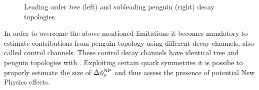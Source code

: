 
\begin{figure}[t]
  \begin{subfigure}{0.5\textwidth}
    \raggedright
    {\scalebox{1}{\sffamily }}
    \label{app_jpsiphi_tree}
  \end{subfigure}%
  \hfill
  \begin{subfigure}{0.5\textwidth}
    \raggedleft
    {\scalebox{1}{\sffamily }}
    \label{app_jpsiphi_peng}
  \end{subfigure}
    \caption{Leading order {\it tree} (left) and subleading penguin (right) \BsJpsiPhi decay topologies.}
  \label{app_jpsiphi_tree_peng}
\end{figure}

In order to overcome the above mentioned limitations it becomes mandatory to estimate
contributions from penguin topology using different decay channels, also called control channels.
These control decay channels have identical tree and penguin topologies with \BsJpsiPhi.
Exploiting certain quark symmetries it is possibe to properly estimate the size of
$\Delta\phi_{s}^{\tiny \text{NP}}$ and thus assess the presence of potential New Physics effects.



